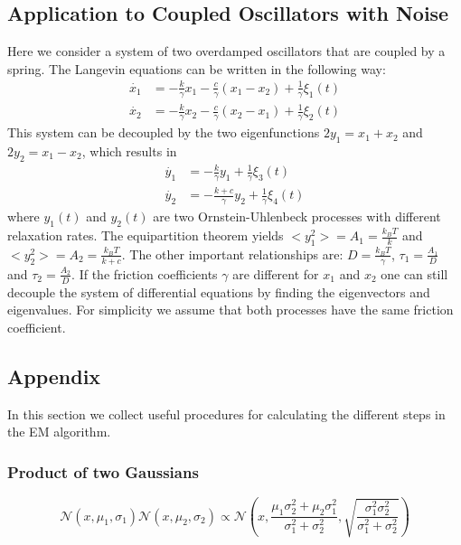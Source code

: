 \documentclass[%
 reprint,
 amsmath,amssymb,
 aps,
]{revtex4-1}
\begin{document}
\subsection{Application to Coupled Oscillators with Noise}
Here we consider a system of two overdamped oscillators that are coupled by a spring.  The Langevin equations can be written in the following way:
\begin{equation}
	\begin{aligned}
		\dot{x_1} &= -\frac{k}{\gamma}x_{1}-\frac{c}{\gamma}(x_{1}-x_{2}) +\frac{1}{\gamma}\xi_{1}(t)\\
		\dot{x_2} &= -\frac{k}{\gamma}x_{2}-\frac{c}{\gamma}(x_{2}-x_{1}) +\frac{1}{\gamma}\xi_{2}(t)
	\end{aligned}
\end{equation}
This system can be decoupled by the two eigenfunctions $2y_{1}=x_{1}+x_{2}$ and $2y_{2}=x_{1}-x_{2}$, which results in
\begin{equation}
	\begin{aligned}
		\dot{y_1} &= -\frac{k}{\gamma}y_{1} +\frac{1}{\gamma}\xi_{3}(t)\\
		\dot{y_2} &= -\frac{k+c}{\gamma}y_{2} +\frac{1}{\gamma}\xi_{4}(t)
	\end{aligned}
\end{equation}
where $y_{1}(t)$ and $y_{2}(t)$ are two Ornstein-Uhlenbeck processes with different relaxation rates.  The equipartition theorem yields $<y_{1}^{2}> = A_{1} = \frac{k_{B}T}{k}$ and $<y_{2}^{2}> = A_{2} = \frac{k_{B}T}{k+c}$.  The other important relationships are: $D=\frac{k_{B}T}{\gamma}$, $\tau_{1}=\frac{A_{1}}{D}$ and $\tau_{2}=\frac{A_{2}}{D}$. If the friction coefficients $\gamma$ are different for $x_{1}$ and $x_{2}$ one can still decouple the system of differential equations by finding the eigenvectors and eigenvalues.  For simplicity we assume that both processes have the same friction coefficient.

\subsection{Appendix}
In this section we collect useful procedures for calculating the different steps in the EM algorithm.
\subsubsection{Product of two Gaussians}
\begin{equation}
\mathcal{N}(x,\mu_{1},\sigma_{1})\mathcal{N}(x,\mu_{2},\sigma_{2}) 
\propto \mathcal{N}\left(x,\frac{\mu_{1}\sigma_{2}^{2}+\mu_{2}\sigma_{1}^{2}}{\sigma_{1}^2+\sigma_{2}^2},\sqrt{\frac{\sigma_{1}^2\sigma_{2}^2}{\sigma_{1}^2+\sigma_{2}^2}}\right)
\end{equation}
\end{document}
